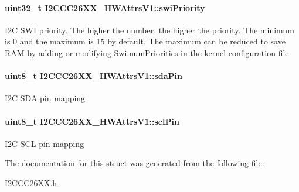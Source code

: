 \paragraph[{swi\+Priority}]{\setlength{\rightskip}{0pt plus 5cm}uint32\+\_\+t I2\+C\+C\+C26\+X\+X\+\_\+\+H\+W\+Attrs\+V1\+::swi\+Priority}\label{struct_i2_c_c_c26_x_x___h_w_attrs_v1_af6dcf5a19b94fa39e89a1435c78f0d61}


I2\+C S\+W\+I priority. The higher the number, the higher the priority. The minimum is 0 and the maximum is 15 by default. The maximum can be reduced to save R\+A\+M by adding or modifying Swi.\+num\+Priorities in the kernel configuration file. 

\paragraph[{sda\+Pin}]{\setlength{\rightskip}{0pt plus 5cm}uint8\+\_\+t I2\+C\+C\+C26\+X\+X\+\_\+\+H\+W\+Attrs\+V1\+::sda\+Pin}\label{struct_i2_c_c_c26_x_x___h_w_attrs_v1_a3387c3315d2b4f62fedf70563fd55931}
I2\+C S\+D\+A pin mapping 
\paragraph[{scl\+Pin}]{\setlength{\rightskip}{0pt plus 5cm}uint8\+\_\+t I2\+C\+C\+C26\+X\+X\+\_\+\+H\+W\+Attrs\+V1\+::scl\+Pin}\label{struct_i2_c_c_c26_x_x___h_w_attrs_v1_a0c0d7cba4b01ece784f35192fdc91b0a}
I2\+C S\+C\+L pin mapping 

The documentation for this struct was generated from the following file\+:\begin{DoxyCompactItemize}
\item 
\hyperlink{_i2_c_c_c26_x_x_8h}{I2\+C\+C\+C26\+X\+X.\+h}\end{DoxyCompactItemize}

